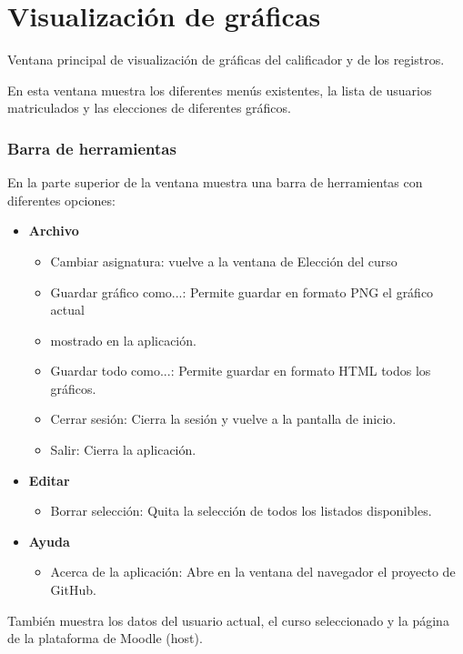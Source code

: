 \section{Visualización de gráficas}

Ventana principal de visualización de gráficas del calificador y de los registros.

En esta ventana muestra los diferentes menús existentes, la lista de usuarios matriculados y las elecciones de diferentes gráficos.


\subsubsection{Barra de herramientas}

En la parte superior de la ventana muestra una barra de herramientas con diferentes opciones:

\begin{itemize}
	\item \textbf{Archivo}
	\begin{itemize}
		\item Cambiar asignatura: vuelve a la ventana de Elección del curso
		\item Guardar gráfico como...: Permite guardar en formato PNG el gráfico actual \item mostrado en la aplicación.
		\item Guardar todo como...: Permite guardar en formato HTML todos los gráficos.
		\item Cerrar sesión: Cierra la sesión y vuelve a la pantalla de inicio.
		\item Salir: Cierra la aplicación.
	\end{itemize}

	\item \textbf{Editar}
	\begin{itemize}
		\item Borrar selección: Quita la selección de todos los listados disponibles.
	\end{itemize}
	\item \textbf{Ayuda}
		\begin{itemize}
		\item Acerca de la aplicación: Abre en la ventana del navegador el proyecto de GitHub.
	\end{itemize}
\end{itemize}

También muestra los datos del usuario actual, el curso seleccionado y la página de la plataforma de Moodle (host).

